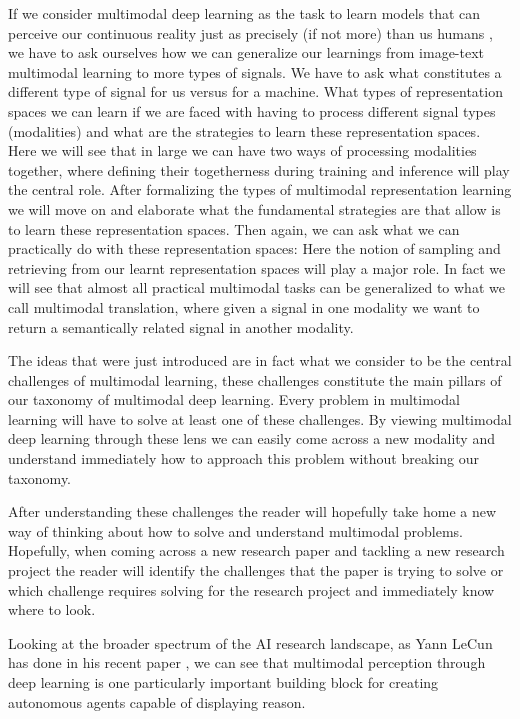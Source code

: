\documentclass[
]{krantz}
\begin{document}
If we consider multimodal deep learning as the task to learn models that can perceive our continuous reality just as precisely (if not more) than us humans \citep{lecun2022path}, we have to ask ourselves how we can generalize our learnings from image-text multimodal learning to more types of signals. We have to ask what constitutes a different type of signal for us versus for a machine. What types of representation spaces we can learn if we are faced with having to process different signal types (modalities) and what are the strategies to learn these representation spaces. Here we will see that in large we can have two ways of processing modalities together, where defining their togetherness during training and inference will play the central role. After formalizing the types of multimodal representation learning we will move on and elaborate what the fundamental strategies are that allow is to learn these representation spaces. Then again, we can ask what we can practically do with these representation spaces: Here the notion of sampling and retrieving from our learnt representation spaces will play a major role. In fact we will see that almost all practical multimodal tasks can be generalized to what we call multimodal translation, where given a signal in one modality we want to return a semantically related signal in another modality.

The ideas that were just introduced are in fact what we consider to be the central challenges of multimodal learning, these challenges constitute the main pillars of our taxonomy of multimodal deep learning. Every problem in multimodal learning will have to solve at least one of these challenges. By viewing multimodal deep learning through these lens we can easily come across a new modality and understand immediately how to approach this problem without breaking our taxonomy.

After understanding these challenges the reader will hopefully take home a new way of thinking about how to solve and understand multimodal problems. Hopefully, when coming across a new research paper and tackling a new research project the reader will identify the challenges that the paper is trying to solve or which challenge requires solving for the research project and immediately know where to look.

Looking at the broader spectrum of the AI research landscape, as Yann LeCun has done in his recent paper \citep{lecun2022path}, we can see that multimodal perception through deep learning is one particularly important building block for creating autonomous agents capable of displaying reason.
\end{document}

